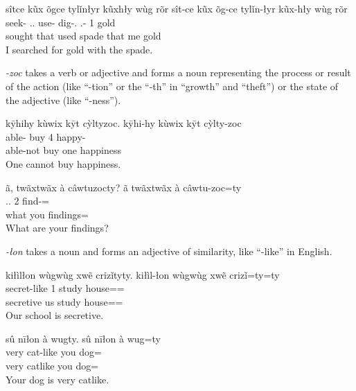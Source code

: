 \begin{exe}
    \ex
    sîtce kũx õgce tylǐnłyr kũxhły wùg rõr
    \glll
    sît-ce kũx õg-ce tylǐn-łyr kũx-hły wùg rõr \\
    seek-\Pst{} \Dem{}.\Anim{}.\Sg{} use-\Pst{} dig-\Agt{}.\Inanim{} \Dem{}.\Anim{}-\Adj{} 1\Sg{} gold \\
    sought that used spade that me gold \\
    \glt
    I searched for gold with the spade.
\end{exe}

\textit{-zoc} takes a verb or adjective and forms a noun
representing the process or result of the action (like ``-tion'' or the ``-th'' in ``growth'' and ``theft'')
or the state of the adjective (like ``-ness'').

\begin{exe}
    \ex
    kȳhihy kùwix kȳt cỳltyzoc.
    \glll
    kȳhi-hy kùwix kȳt cỳlty-zoc \\
    able-\Neg{} buy 4\Sg{} happy-\Nmlz{} \\
    able-not buy one happiness \\
    \glt
    One cannot buy happiness.
\end{exe}

\begin{exe}
    \ex
    ã, twãxtwãx à câwtuzocty?
    \glll
    ã twãxtwãx à câwtu-zoc=ty \\
    \Q{} \Int{}.\Inanim{}.\Pl{} 2\Sg{} find-\Nmlz{}=\Poss{} \\
    \Q{} what you findings=\Poss{} \\
    \glt
    What are your findings?
\end{exe}

\textit{-łon} takes a noun and forms an adjective of similarity,
like ``-like'' in English.

\begin{exe}
    \ex
    kiłìlłon wùgwùg xwẽ crizǐtyty.
    \glll
    kiłìl-łon wùgwùg xwẽ crizǐ=ty=ty \\
    secret-like 1\Pl{} study house=\Poss{}=\Poss{} \\
    secretive us study house=\Poss{}=\Poss{} \\
    \glt
    Our school is secretive.
\end{exe}

\begin{exe}
    \ex
    sû nīłon à wugty.
    \glll
    sû nīłon à wug=ty \\
    very cat-like you dog=\Poss{} \\
    very catlike you dog=\Poss{} \\
    \glt
    Your dog is very catlike.
\end{exe}

